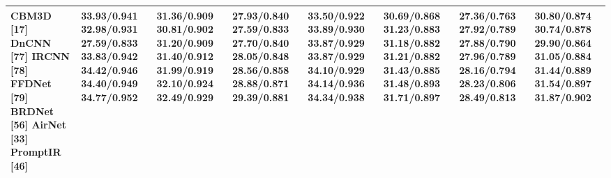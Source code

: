 \begin{tabular}{llllllll}
\toprule
CBM3D [17] DnCNN [77] IRCNN [78] FFDNet [79] BRDNet [56] AirNet [33] PromptIR [46] & 33.93/0.941 32.98/0.931 27.59/0.833 33.83/0.942 34.42/0.946 34.40/0.949 34.77/0.952 & 31.36/0.909 30.81/0.902 31.20/0.909 31.40/0.912 31.99/0.919 32.10/0.924 32.49/0.929 & 27.93/0.840 27.59/0.833 27.70/0.840 28.05/0.848 28.56/0.858 28.88/0.871 29.39/0.881 & 33.50/0.922 33.89/0.930 33.87/0.929 33.87/0.929 34.10/0.929 34.14/0.936 34.34/0.938 & 30.69/0.868 31.23/0.883 31.18/0.882 31.21/0.882 31.43/0.885 31.48/0.893 31.71/0.897 & 27.36/0.763 27.92/0.789 27.88/0.790 27.96/0.789 28.16/0.794 28.23/0.806 28.49/0.813 & 30.80/0.874 30.74/0.878 29.90/0.864 31.05/0.884 31.44/0.889 31.54/0.897 31.87/0.902 \\
\midrule
\bottomrule
\end{tabular}
